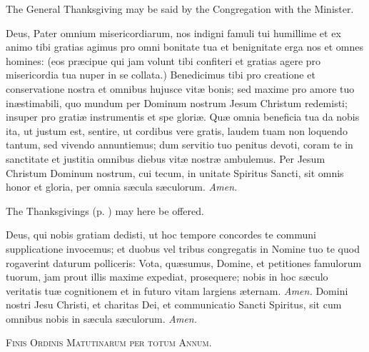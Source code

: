 \begin{rubric}
    The General Thanksgiving may be said by the Congregation with the Minister.
\end{rubric}
 Deus, Pater omnium misericordiarum, nos indigni famuli tui humillime et ex animo tibi gratias agimus pro omni bonitate tua et benignitate erga nos et omnes homines: (eos præcipue qui jam volunt tibi confiteri et gratias agere pro misericordia tua nuper in se collata.) Benedicimus tibi pro creatione et conservatione nostra et omnibus hujusce vitæ bonis; sed maxime pro amore tuo inæstimabili, quo mundum per Dominum nostrum Jesum Christum redemisti; insuper pro gratiæ instrumentis et spe gloriæ. Quæ omnia beneficia tua da nobis ita, ut justum est, sentire, ut cordibus vere gratis, laudem tuam non loquendo tantum, sed vivendo annuntiemus; dum servitio tuo penitus devoti, coram te in sanctitate et justitia omnibus diebus vitæ nostræ ambulemus. Per Jesum Christum Dominum nostrum, cui tecum, in unitate Spiritus Sancti, sit omnis honor et gloria, per omnia sæcula sæculorum. \textit{Amen.}
\begin{rubric}
    The Thanksgivings (p. \pageref{thanksgiving}) may here be offered.
\end{rubric}
\vspace{-2ex}
 Deus, qui nobis gratiam dedisti, ut hoc tempore concordes te communi supplicatione invocemus; et duobus vel tribus congregatis in Nomine tuo te quod rogaverint daturum polliceris: Vota, quæsumus, Domine, et petitiones famulorum tuorum, jam prout illis maxime expediat, prosequere; nobis in hoc sæculo veritatis tuæ cognitionem et in futuro vitam largiens æternam. \textit{Amen.}
 Domini nostri Jesu Christi, et charitas Dei, et communicatio Sancti Spiritus, sit cum omnibus nobis in sæcula sæculorum. \textit{Amen.}

\begin{center}
    \textsc{Finis Ordinis Matutinarum per totum Annum.}
\end{center}